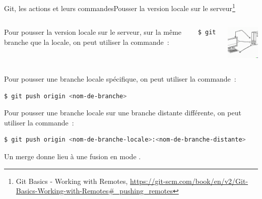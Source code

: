 \documentclass{beamer}
\begin{document}
    \begin{frame}[fragile]{Git, les actions et leurs commandes}{Pousser la version locale sur le serveur\footnote{\label{progitpushing}Git Basics - Working with Remotes, \url{https://git-scm.com/book/en/v2/Git-Basics-Working-with-Remotes\#_pushing_remotes}}}
        \transdissolve


        \begin{columns}
            Pour pousser la version locale sur le serveur, sur la même branche que la locale, on peut utiliser la commande~:
            \begin{lstlisting}[language=sh]
$ git push
            \end{lstlisting}
            \centering
            \begin{center}
                \includegraphics[width=3cm]{image/schematic-drawing-of-a-computer-linked-to-a-remote-server}
            \end{center}
        \end{columns}

        Pour pousser une branche locale spécifique, on peut utiliser la commande~:
        \begin{lstlisting}[language=sh]
$ git push origin <nom-de-branche>
        \end{lstlisting}
        Pour pousser une branche locale sur une branche distante différente, on peut utiliser la commande~:
        \begin{lstlisting}[language=sh]
$ git push origin <nom-de-branche-locale>:<nom-de-branche-distante>
        \end{lstlisting}

        Un merge donne lieu à une fusion en mode .
    \end{frame}
\end{document}
